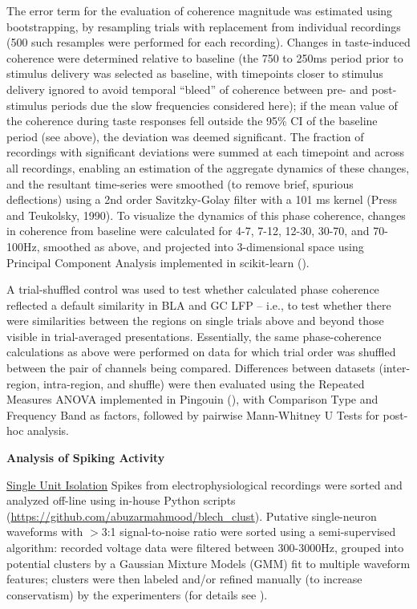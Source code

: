 \begin{refsection}
The error term for the evaluation of coherence magnitude was estimated using bootstrapping, by resampling trials with replacement from individual recordings (500 such resamples were performed for each recording). Changes in taste-induced coherence were determined relative to baseline (the 750 to 250ms period prior to stimulus delivery was selected as baseline, with timepoints closer to stimulus delivery ignored to avoid temporal “bleed” of coherence between pre- and post-stimulus periods due the slow frequencies considered here); if the mean value of the coherence during taste responses fell outside the 95\% CI of the baseline period (see above), the deviation was deemed significant. The fraction of recordings with significant deviations were summed at each timepoint and across all recordings, enabling an estimation of the aggregate dynamics of these changes, and the resultant time-series were smoothed (to remove brief, spurious deflections) using a 2nd order Savitzky-Golay filter with a 101 ms kernel (Press and Teukolsky, 1990). To visualize the dynamics of this phase coherence, changes in coherence from baseline were calculated for 4-7, 7-12, 12-30, 30-70, and 70-100Hz, smoothed as above, and projected into 3-dimensional space using Principal Component Analysis implemented in scikit-learn (\cite{pedregosa2011a}).

A trial-shuffled control was used to test whether calculated phase coherence reflected a default similarity in BLA and GC LFP – i.e., to test whether there were similarities between the regions on single trials above and beyond those visible in trial-averaged presentations. Essentially, the same phase-coherence calculations as above were performed on data for which trial order was shuffled between the pair of channels being compared. Differences between datasets (inter-region, intra-region, and shuffle) were then evaluated using the Repeated Measures ANOVA implemented in Pingouin (\cite{vallat2018a}), with Comparison Type and Frequency Band as factors, followed by pairwise Mann-Whitney U Tests for post-hoc analysis.

\noindent\textbf{Analysis of Spiking Activity}\par
\smallskip

\noindent\underline{Single Unit Isolation}
Spikes from electrophysiological recordings were sorted and analyzed off-line using in-house Python scripts (\url{https://github.com/abuzarmahmood/blech_clust}). Putative single-neuron waveforms with \(>\)3:1 signal-to-noise ratio were sorted using a semi-supervised algorithm: recorded voltage data were filtered between 300-3000Hz, grouped into potential clusters by a Gaussian Mixture Models (GMM) fit to multiple waveform features; clusters were then labeled and/or refined manually (to increase conservatism) by the experimenters (for details see \cite{mukherjee2017a}). 


\end{refsection}
